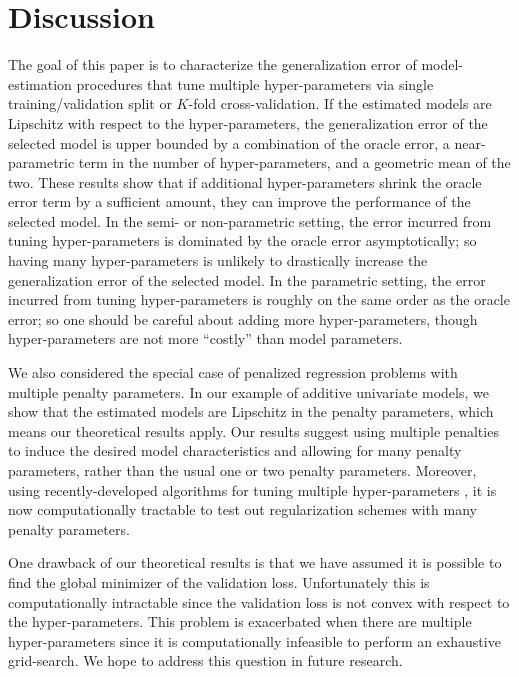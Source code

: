 \documentclass[12pt]{article} %
\theoremstyle{definition}
\begin{document}
\section{Discussion}\label{sec:discussion}

The goal of this paper is to characterize the generalization error of model-estimation procedures that tune multiple hyper-parameters via single training/validation split or $K$-fold cross-validation. 
If the estimated models are Lipschitz with respect to the hyper-parameters, the generalization error of the selected model is upper bounded by a combination of the oracle error, a near-parametric term in the number of hyper-parameters, and a geometric mean of the two.
These results show that if additional hyper-parameters shrink the oracle error term by a sufficient amount, they can improve the performance of the selected model.
In the semi- or non-parametric setting, the error incurred from tuning hyper-parameters is dominated by the oracle error asymptotically; so having many hyper-parameters is unlikely to drastically increase the generalization error of the selected model.
In the parametric setting, the error incurred from tuning hyper-parameters is roughly on the same order as the oracle error; so one should be careful about adding more hyper-parameters, though hyper-parameters are not more ``costly'' than model parameters.


We also considered the special case of penalized regression problems with multiple penalty parameters. In our example of additive univariate models, we show that the estimated models are Lipschitz in the penalty parameters, which means our theoretical results apply. Our results suggest using multiple penalties to induce the desired model characteristics and allowing for many penalty parameters, rather than the usual one or two penalty parameters. Moreover, using recently-developed algorithms for tuning multiple hyper-parameters \citep{bengio2000gradient, foo2008efficient, snoek2012practical}, it is now computationally tractable to test out regularization schemes with many penalty parameters.

One drawback of our theoretical results is that we have assumed it is possible to find the global minimizer of the validation loss. Unfortunately this is computationally intractable since the validation loss is not convex with respect to the hyper-parameters. This problem is exacerbated when there are multiple hyper-parameters since it is computationally infeasible to perform an exhaustive grid-search. We hope to address this question in future research.
\end{document}
